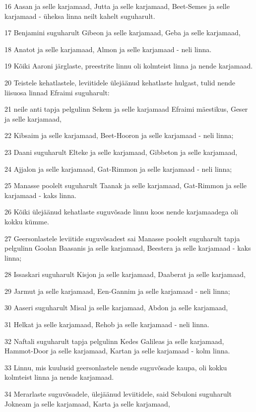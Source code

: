 \par 16 Aasan ja selle karjamaad, Jutta ja selle karjamaad, Beet-Semes ja selle karjamaad - üheksa linna neilt kahelt suguharult.
\par 17 Benjamini suguharult Gibeon ja selle karjamaad, Geba ja selle karjamaad,
\par 18 Anatot ja selle karjamaad, Almon ja selle karjamaad - neli linna.
\par 19 Kõiki Aaroni järglaste, preestrite linnu oli kolmteist linna ja nende karjamaad.
\par 20 Teistele kehatlastele, leviitidele ülejäänud kehatlaste hulgast, tulid nende liisuosa linnad Efraimi suguharult:
\par 21 neile anti tapja pelgulinn Sekem ja selle karjamaad Efraimi mäestikus, Geser ja selle karjamaad,
\par 22 Kibsaim ja selle karjamaad, Beet-Hooron ja selle karjamaad - neli linna;
\par 23 Daani suguharult Elteke ja selle karjamaad, Gibbeton ja selle karjamaad,
\par 24 Ajjalon ja selle karjamaad, Gat-Rimmon ja selle karjamaad - neli linna;
\par 25 Manasse poolelt suguharult Taanak ja selle karjamaad, Gat-Rimmon ja selle karjamaad - kaks linna.
\par 26 Kõiki ülejäänud kehatlaste suguvõsade linnu koos nende karjamaadega oli kokku kümme.
\par 27 Geersonlastele leviitide suguvõsadest sai Manasse poolelt suguharult tapja pelgulinn Goolan Baasanis ja selle karjamaad, Beestera ja selle karjamaad - kaks linna;
\par 28 Issaskari suguharult Kisjon ja selle karjamaad, Daaberat ja selle karjamaad,
\par 29 Jarmut ja selle karjamaad, Een-Gannim ja selle karjamaad - neli linna;
\par 30 Aaseri suguharult Misal ja selle karjamaad, Abdon ja selle karjamaad,
\par 31 Helkat ja selle karjamaad, Rehob ja selle karjamaad - neli linna.
\par 32 Naftali suguharult tapja pelgulinn Kedes Galileas ja selle karjamaad, Hammot-Door ja selle karjamaad, Kartan ja selle karjamaad - kolm linna.
\par 33 Linnu, mis kuulusid geersonlastele nende suguvõsade kaupa, oli kokku kolmteist linna ja nende karjamaad.
\par 34 Merarlaste suguvõsadele, ülejäänud leviitidele, said Sebuloni suguharult Jokneam ja selle karjamaad, Karta ja selle karjamaad,
